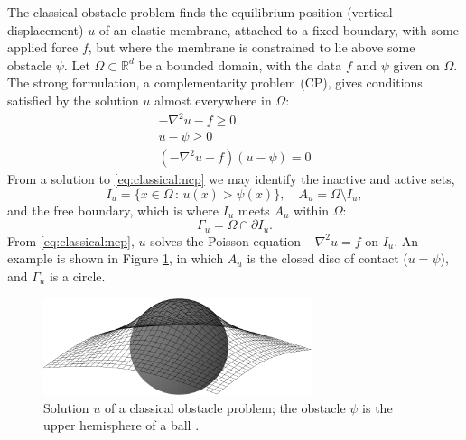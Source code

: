 \documentclass[]{interact}
\theoremstyle{plain}%
\theoremstyle{definition}
\theoremstyle{remark}
\newcommand{\RR}{\mathbb{R}}
\begin{document}
The classical obstacle problem \cite{KinderlehrerStampacchia1980} finds the equilibrium position (vertical displacement) $u$ of an elastic membrane, attached to a fixed boundary, with some applied force $f$, but where the membrane is constrained to lie above some obstacle $\psi$.  Let $\Omega \subset \RR^d$ be a bounded domain, with the data $f$ and $\psi$ given on $\Omega$.  The strong formulation, a complementarity problem (CP), gives conditions satisfied by the solution $u$ almost everywhere in $\Omega$:
\begin{subequations} \label{eq:classical:ncp}
\begin{align}
  -\nabla^2 u - f \geq 0 \\
  u - \psi \geq 0\\
  (-\nabla^2u - f)(u - \psi) = 0
\end{align}
\end{subequations}
From a solution to \eqref{eq:classical:ncp} we may identify the inactive and active sets,
\begin{equation}
  I_u = \{x \in \Omega \,:\, u(x) > \psi(x)\}, \quad A_u = \Omega \setminus I_u, \label{eq:classical:sets}
\end{equation}
and the free boundary, which is where $I_u$ meets $A_u$ within $\Omega$:
\begin{equation}
  \Gamma_u = \Omega \cap \partial I_u. \label{eq:classical:free}
\end{equation}
From \eqref{eq:classical:ncp}, $u$ solves the Poisson equation $-\nabla^2u = f$ on $I_u$.  An example is shown in Figure \ref{fig:ball}, in which $A_u$ is the closed disc of contact ($u=\psi$), and $\Gamma_u$ is a circle.

\begin{figure}[H]
\centering
\includegraphics[width=0.7\textwidth]{static/obstacle65.pdf}
\caption{Solution $u$ of a classical obstacle problem; the obstacle $\psi$ is the upper hemisphere of a ball \cite[used by permission]{Bueler2021}.}
\label{fig:ball}
\end{figure}
\end{document}
